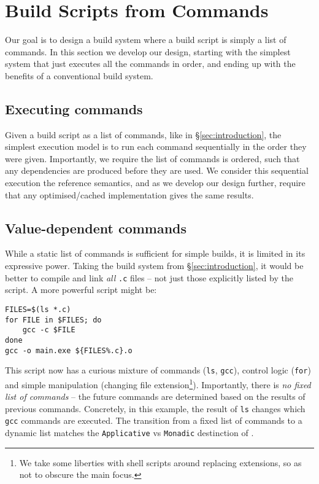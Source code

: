 \section{Build Scripts from Commands}
\label{sec:design}

Our goal is to design a build system where a build script is simply a list of commands. In this section we develop our design, starting with the simplest system that just executes all the commands in order, and ending up with the benefits of a conventional build system.

\subsection{Executing commands}
\label{sec:executing_commands}

Given a build script as a list of commands, like in \S\ref{sec:introduction}, the simplest execution model is to run each command sequentially in the order they were given. Importantly, we require the list of commands is ordered, such that any dependencies are produced before they are used. We consider this sequential execution the reference semantics, and as we develop our design further, require that any optimised/cached implementation gives the same results.

\subsection{Value-dependent commands}
\label{sec:monadic}

While a static list of commands is sufficient for simple builds, it is limited in its expressive power. Taking the build system from \S\ref{sec:introduction}, it would be better to compile and link \emph{all} \texttt{.c} files -- not just those explicitly listed by the script. A more powerful script might be:

\vspace{3mm}
\begin{verbatim}
FILES=$(ls *.c)
for FILE in $FILES; do
    gcc -c $FILE
done
gcc -o main.exe ${FILES%.c}.o
\end{verbatim}
\vspace{3mm}

This script now has a curious mixture of commands (\texttt{ls}, \texttt{gcc}), control logic (\texttt{for}) and simple manipulation (changing file extension\footnote{We take some liberties with shell scripts around replacing extensions, so as not to obscure the main focus.}). Importantly, there is \emph{no fixed list of commands} -- the future commands are determined based on the results of previous commands. Concretely, in this example, the result of \texttt{ls} changes which \texttt{gcc} commands are executed. The transition from a fixed list of commands to a dynamic list matches the \texttt{Applicative} vs \texttt{Monadic} destinction of \citet[\S3.5]{build_systems_a_la_carte}.

